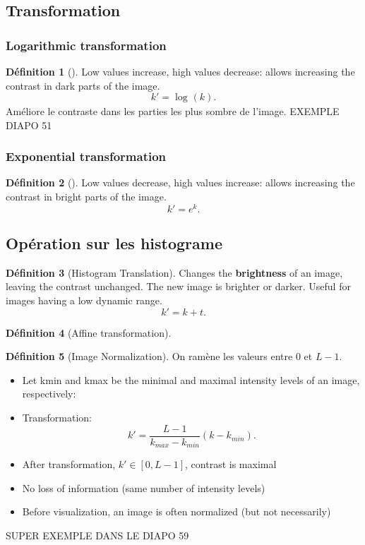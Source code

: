 \documentclass{article}
\theoremstyle{plain}%
\theoremstyle{definition}
\newtheorem{defn}{Définition}[section]
\theoremstyle{remark}
\begin{document}
\subsection{Transformation}
\subsubsection{Logarithmic transformation}
\begin{defn}[]
    Low values increase, high values decrease: allows increasing
    the contrast in dark parts of the image.    
    \[
        k' = \log_{} (k)
    .\]
    Améliore le contraste dans les parties les plus sombre de l'image. EXEMPLE DIAPO 51
\end{defn}

\subsubsection{Exponential transformation}
\begin{defn}[]
    Low values decrease, high values increase: allows increasing the contrast in bright parts of the image. 
    \[
        k' = e^k
    .\]
\end{defn}

\subsection{Opération sur les histograme }
\begin{defn}[Histogram Translation]
    Changes the \textbf{brightness} of an image, leaving the contrast unchanged. The new image is brighter or darker. Useful for images having a low dynamic range.
    \[
        k' = k+t
    .\]
\end{defn}

\begin{defn}[Affine transformation]
    
\end{defn}

\begin{defn}[Image Normalization]
    On ramène les valeurs entre 0 et $ L-1 $.
    \begin{itemize}
        \item Let kmin and kmax be the minimal and maximal intensity levels
        of an image, respectively:
        \item Transformation: 
        \[
            k' = \frac{L - 1}{k_{max} - k_{min}} (k - k_{min})
        .\]
        \item After transformation, $ k' \in [0, L-1] $, contrast is maximal
        \item No loss of information (same number of intensity levels)
        \item Before visualization, an image is often normalized (but not necessarily)
    \end{itemize}
    SUPER EXEMPLE DANS LE DIAPO 59  
\end{defn}
\end{document}
